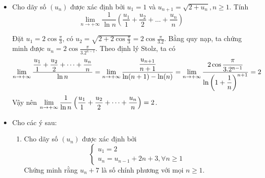 \documentclass[11pt]{scrartcl}
\begin{document}
\begin{itemize}[label=, leftmargin=0em, itemsep=0.5em]
\begin{sol}
\begin{proof}
         Không tồn tại $n_0$ để $\lfloor b_{n_0}\rfloor =M$ mà lại tồn tại $m_0$ để $\lfloor b_{m_0} \rfloor > M$. Để $(\lfloor b_n \rfloor)$ không nhận giá trị của $M$ mà lại nhận những giá trị nguyên lớn hơn nó thì phải tồn tại $a_k$ để $a_k > 1$, điều này là vô lý.

         Không tồn tại $n_0$ để $\lfloor b_{n_0}\rfloor =M$ và cũng không tồn tại $m_0$ để $\lfloor b_{m_0} \rfloor > M$. Khi này rõ ràng là đến một lúc nào đó, sẽ tồn tại $m > 0$ và $N > 0$ để $b_{n_0} < m, \forall n_0 > N$, tức là $(b_n)$ bị chặn trên. Mặt khác $(b_n)$ cũng là dãy tăng, nên theo Weierstrass thì $(b_n)$ có giới hạn hữu hạn, cũng vô lý. 

        Vậy là bổ đề đã được chứng minh.
        \end{proof}
        Mặt khác, ta có 
        \[
            \dsum_{i = 1}^n \frac{i}{a_i} \geq \dsum_{i = 1}^n \frac{i}{(i + 1)^2} = \dsum_{i = 2}^n \frac{1}{i} - \dsum_{i = 1}^{n} \frac{1}{i^2} > \dsum_{i = 2}^n \frac{1}{i} - 2
        \] Cho $n \to +\infty$ thì ta được $\dlim s_n = +\infty$. Khi đó, áp dụng bổ đề trên, ta có được điều phải chứng minh.
        
        

        
    \end{sol}
    \item \begin{bt}
        Cho dãy số $(u_n)$ được xác định bởi $u_1 = 1$ và $u_{n + 1} = \sqrt{2 + u_n}, n \geq 1$. Tính
        \[
            \lim_{n \to + \infty} \frac{1}{\ln n}\left(\frac{u_1}{1} + \frac{u_2}{2} + \dots + \frac{u_n}{n}\right)
        \]
    \end{bt}
    \begin{sol}
        Đặt $u_1 = 2\cos\frac{\pi}{3}$, có $u_2 = \sqrt{2 + 2\cos\frac{\pi}{3} }= 2\cos\frac{\pi}{3.2}$. Bằng quy nạp, ta chứng minh được $u_n = 2\cos\frac{\pi}{3.2^{n - 1}}$. Theo định lý Stolz, ta có 
        \[
            \lim_{n \to + \infty} \frac{\frac{u_1}{1} + \frac{u_2}{2} + \dots + \frac{u_n}{n}}{\ln n } = \dlim \frac{\frac{u_{n + 1}}{n + 1}}{\ln(n + 1) - \ln(n)} = \dlim \frac{2\cos\frac{\pi}{3.2^{n - 1}}}{\ln\left(1 + \frac{1}{n}\right)^{n + 1}} = 2
        \]
        Vậy nên $\dlim \frac{1}{\ln n}\left(\frac{u_1}{1} + \frac{u_2}{2} + \dots + \frac{u_n}{n}\right) = 2$.
    \end{sol}

    \item \begin{bt} Cho các ý sau:
        \begin{enumerate}
            \item Cho dãy số $(u_n)$ được xác định bởi
            \[\left\{
                \begin{array}{l}
                    u_1 = 2 \\
                    u_n = u_{n - 1} + 2n + 3, \forall n \geq 1 
                \end{array}\right.\]
            Chứng minh rằng $u_n + 7$ là số chính phương với mọi $n \geq 1$.
            

\end{enumerate}
\end{bt}
\end{itemize}
\end{document}
